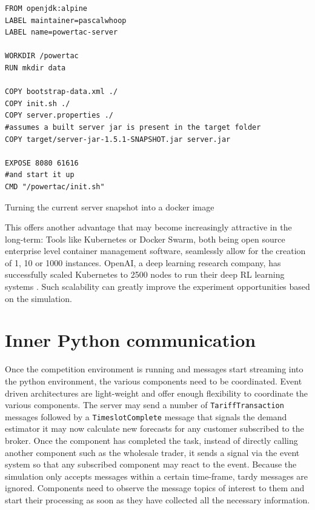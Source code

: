 \begin{listing}[h]

    \begin{verbatim}
FROM openjdk:alpine
LABEL maintainer=pascalwhoop
LABEL name=powertac-server

WORKDIR /powertac
RUN mkdir data

COPY bootstrap-data.xml ./
COPY init.sh ./
COPY server.properties ./
#assumes a built server jar is present in the target folder
COPY target/server-jar-1.5.1-SNAPSHOT.jar server.jar

EXPOSE 8080 61616
#and start it up
CMD "/powertac/init.sh"
    \end{verbatim}
    \caption{Turning the current server snapshot into a docker image}
    \label{lst:servertodocker}
\end{listing}

This offers another advantage that may become increasingly attractive in the long-term: Tools like Kubernetes or Docker
Swarm, both being open source enterprise level container management software, seamlessly allow for the creation of 1, 10
or 1000 instances. OpenAI, a deep learning research company, has successfully scaled Kubernetes to 2500 nodes to run
their deep \ac{RL} learning systems \citep{openai2500}. Such scalability can greatly improve the experiment
opportunities based on the simulation.

\section{Inner Python communication}%
\label{sub:inner_python_communication}

Once the competition environment is running and messages start streaming into the python environment, the various
components need to be coordinated. Event driven architectures are light-weight and offer
enough flexibility to coordinate the various components. The server may send a number of \texttt{TariffTransaction}
messages followed by a \texttt{TimeslotComplete} message that signals the demand estimator it may now calculate new
forecasts for any customer subscribed to the broker. Once the component has completed the task, instead of directly
calling another component such as the wholesale trader, it sends a signal via the event system so that any subscribed
component may react to the event. Because the simulation only accepts messages within a certain time-frame, tardy
messages are ignored. Components need to observe the message topics of interest to them and start their processing as
soon as they have collected all the necessary information.

